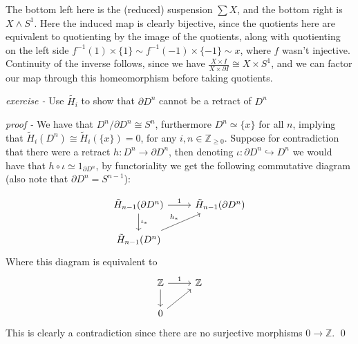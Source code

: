 \documentclass[11pt]{article}
\theoremstyle{definition}
\newcommand{\set}[1]{\{#1\}}
\begin{document}
    The bottom left here is the (reduced) suspension \(\sum X\), and the bottom right is \(X \wedge S^1\). Here the induced map is clearly bijective, since the quotients here are equivalent to quotienting by the image of the quotients, along with quotienting on the left side \(f^{-1}(1) \times \set{1} \sim f^{-1}(-1) \times \set{-1} \sim x\), where \(f\) wasn't injective. Continuity of the inverse follows, since we have \(\frac{X \times I}{X \times \partial I} \cong X \times S^1\), and we can factor our map through this homeomorphism before taking quotients.

    \emph{exercise - }\label{HEx10} Use \(\tilde{H_i}\) to show that \(\partial D^n\) cannot be a retract of \(D^n\)

    \emph{proof - } We have that \(D^n/\partial D^n \cong S^n\), furthermore \(D^n \simeq \set{x}\) for all \(n\), implying that \(\tilde{H}_i(D^n) \cong \tilde{H}_i(\set{x}) = 0\), for any \(i,n \in \mathbb{Z}_{\geq 0}\). Suppose for contradiction that there were a retract \(h: D^n \to \partial D^n\), then denoting \(\iota: \partial D^n \hookrightarrow D^n\) we would have that \(h \circ \iota \simeq 1_{\partial D^n}\), by functoriality we get the following commutative diagram (also note that \(\partial D^n = S^{n-1}\)):

    \begin{equation*}
        \begin{tikzcd}
            \tilde{H}_{n-1}(\partial D^n) \arrow[r,"{1}"] \arrow[d,"{\iota_*}"] &\tilde{H}_{n-1}(\partial D^n) \\
            \tilde{H}_{n-1}(D^n) \arrow[ur,"{h_*}"]
        \end{tikzcd}
    \end{equation*}
    Where this diagram is equivalent to
    \begin{equation*}
        \begin{tikzcd}
            \mathbb{Z} \arrow[r,"{1}"] \arrow[d] &\mathbb{Z} \\
            0 \arrow[ur]
        \end{tikzcd}
    \end{equation*}
    This is clearly a contradiction since there are no surjective morphisms \(0 \to \mathbb{Z}\). \qed
\end{document}
